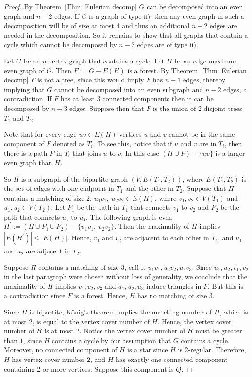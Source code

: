 \documentclass[10pt,a4paper]{amsart}
\begin{document}
\begin{proof}
By Theorem~\ref{Thm: Eulerian decomp} $G$ can be decomposed into an even graph and $n-2$ edges. 
If $G$ is a graph of type ii), then any even graph in such a decomposition will be of size at most 4 and thus an additional $n-2$ edges are needed in the decomposition.
So it remains to show that all graphs that contain a cycle which cannot be decomposed by $n-3$ edges are of type ii).

Let $G$ be an $n$ vertex graph that contains a cycle.
Let $H$ be an edge maximum even graph of $G$.
Then $F:=G - E(H)$ is a forest. 
By Theorem~\ref{Thm: Eulerian decomp} $F$ is not a tree, 
since this would imply $F$ has $n-1$ edges, 
thereby implying that $G$ cannot be decomposed into an even subgraph and $n-2$ edges, a contradiction.
If $F$ has at least $3$ connected components then it can be decomposed by $n-3$ edges. 
Suppose then that $F$ is the union of 2 disjoint trees $T_1$ and $T_2$. 

Note that for every edge $uv\in E(H)$ vertices $u$ and $v$ cannot be in the same component of $F$ denoted as $T_i$.
To see this, notice that if $u$ and $v$ are in $T_i$, then
there is a path $P$ in $ T_i$ that joins $u$ to $v$.
In this case $(H\cup P) - \{uv\}$ is a larger even graph than $H$.


So $H$ is a subgraph of the bipartite graph $(V,E(T_1,T_2))$,
where $E(T_1,T_2)$ is the set of edges with one endpoint in $T_1$ and the other in $T_2$.
Suppose that $H$ contains a matching of size $2$,
$u_1v_1,~u_2v_2\in E(H)$,
where $v_1,v_2\in V(T_1)$ and $u_1,u_2\in V(T_2)$.
Let $P_1$ be the path in $T_1$ that connects $v_1$ to $v_2$ and $P_2$ be the path that connects $u_1$ to $u_2$. 
The following graph is even $H^\prime:= (H\cup P_1\cup P_2) - \{u_1v_1,~u_2v_2\}$.
Then the maximality of $H$ implies $|E(H^\prime)| \leq |E(H)|$.
Hence, $v_1$ and $v_2$ are adjacent to each other in $T_1$, and $u_1$ and $u_2$ are adjacent in $T_2$. 

Suppose $H$ contains a matching of size $3$, call it $u_1v_1,u_2v_2,u_3v_3$.
Since $u_1,u_2,v_1,v_2$ in the last paragraph were chosen without loss of generality, we conclude that the maximality of $H$ implies $v_1,v_2,v_3$ and $u_1,u_2,u_3$ induce triangles in $F$.
But this is a contradiction since $F$ is a forest.
Hence, $H$ has no matching of size $3$.


Since $H$ is bipartite, K\H{o}nig's theorem implies the matching number of $H$, which is at most $2$, 
is equal to the vertex cover number of $H$.
Hence, the vertex cover number of $H$ is at most $2$.
Notice the vertex cover number
of $H$ must be greater than $1$, since $H$ contains a cycle by our assumption that $G$ contains a cycle.
Moreover, no connected component of $H$ is a star since $H$ is 2-regular. 
Therefore, $H$ has vertex cover number $2$, and $H$ has exactly one connected component containing $2$ or more vertices.
Suppose this component is $Q$.



\end{proof}
\end{document}
